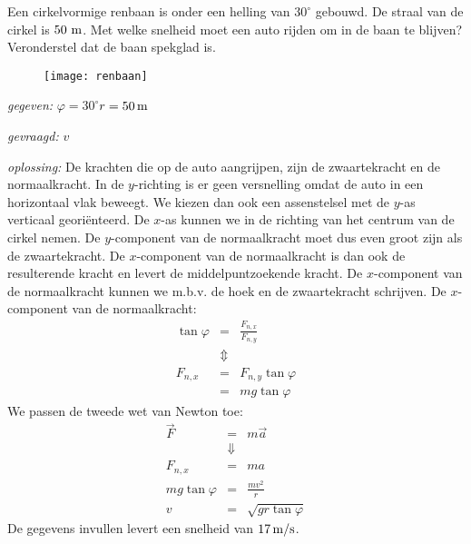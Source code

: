 \begin{exercise} Een cirkelvormige renbaan is onder een helling van $30^\circ$
gebouwd. De straal van de cirkel is $50~\rm m$. Met welke snelheid
moet een auto rijden om in de baan te blijven? Veronderstel dat de
baan spekglad is. 
\begin{oplossing}
\begin{figure}[h]
\centering\texttt{[image: renbaan]}
\end{figure}
\newline
\item [\textit{gegeven:}]$\varphi=30^\circ$\newline$r=50\rm\,m$
\item [\textit{gevraagd:}]$v$
\item [\textit{oplossing:}]De krachten die op de auto aangrijpen, zijn de zwaartekracht en de normaalkracht. In de $y$-richting is er geen versnelling omdat de auto in een horizontaal vlak beweegt. We kiezen dan ook een assenstelsel met de $y$-as verticaal geori\"enteerd. De $x$-as kunnen we in de richting van het centrum van de cirkel nemen. De $y$-component van de normaalkracht moet dus even groot zijn als de zwaartekracht. De $x$-component van de normaalkracht is dan ook de resulterende kracht en levert de middelpuntzoekende kracht. De $x$-component van de normaalkracht kunnen we m.b.v. de hoek en de zwaartekracht schrijven.
\newline
\newline
De $x$-component van de normaalkracht:
\begin{eqnarray*}
\tan{\varphi}&=&\frac{F_{n,x}}{F_{n,y}}\\
&\Updownarrow&\\
F_{n,x}&=&F_{n,y}\tan{\varphi}\\
&=&mg\tan{\varphi}
\end{eqnarray*}
We passen de tweede wet van Newton toe:
\begin{eqnarray*}
\vec{F}&=&m\vec{a}\\
&\Downarrow&\\
F_{n,x}&=&ma\\
mg\tan{\varphi}&=&\frac{mv^2}{r}\\
v&=&\sqrt{gr\tan{\varphi}}
\end{eqnarray*}
De gegevens invullen levert een snelheid van $17\rm\,m/s$.
\end{oplossing}



\end{exercise}

